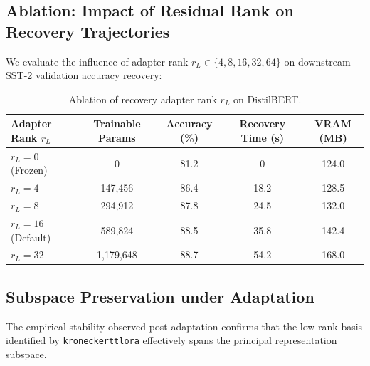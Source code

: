 \subsection{Ablation: Impact of Residual Rank on Recovery Trajectories}
We evaluate the influence of adapter rank $r_L \in \{4, 8, 16, 32, 64\}$ on downstream SST-2 validation accuracy recovery:
\begin{table}[H]
\centering
\small
\begin{tabular}{lcccc}
\toprule
\textbf{Adapter Rank $r_L$} & \textbf{Trainable Params} & \textbf{Accuracy (\%)} & \textbf{Recovery Time (s)} & \textbf{VRAM (MB)} \\
\midrule
$r_L = 0$ (Frozen) & 0 & 81.2 & 0 & 124.0 \\
$r_L = 4$ & 147,456 & 86.4 & 18.2 & 128.5 \\
$r_L = 8$ & 294,912 & 87.8 & 24.5 & 132.0 \\
$r_L = 16$ (Default) & 589,824 & 88.5 & 35.8 & 142.4 \\
$r_L = 32$ & 1,179,648 & 88.7 & 54.2 & 168.0 \\
\bottomrule
\end{tabular}
\caption{Ablation of recovery adapter rank $r_L$ on DistilBERT.}
\label{tab:ablation_adapter_rank}
\end{table}

\subsection{Subspace Preservation under Adaptation}
The empirical stability observed post-adaptation confirms that the low-rank basis identified by \texttt{kroneckerttlora} effectively spans the principal representation subspace.
